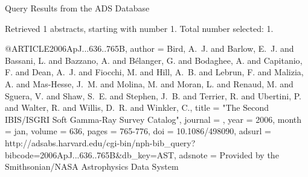 Query Results from the ADS Database


Retrieved 1 abstracts, starting with number 1.  Total number selected: 1.

@ARTICLE{2006ApJ...636..765B,
   author = {{Bird}, A.~J. and {Barlow}, E.~J. and {Bassani}, L. and {Bazzano}, A. and 
	{B{\'e}langer}, G. and {Bodaghee}, A. and {Capitanio}, F. and 
	{Dean}, A.~J. and {Fiocchi}, M. and {Hill}, A.~B. and {Lebrun}, F. and 
	{Malizia}, A. and {Mas-Hesse}, J.~M. and {Molina}, M. and {Moran}, L. and 
	{Renaud}, M. and {Sguera}, V. and {Shaw}, S.~E. and {Stephen}, J.~B. and 
	{Terrier}, R. and {Ubertini}, P. and {Walter}, R. and {Willis}, D.~R. and 
	{Winkler}, C.},
    title = "{The Second IBIS/ISGRI Soft Gamma-Ray Survey Catalog}",
  journal = {\apj},
     year = 2006,
    month = jan,
   volume = 636,
    pages = {765-776},
      doi = {10.1086/498090},
   adsurl = {http://adsabs.harvard.edu/cgi-bin/nph-bib_query?bibcode=2006ApJ...636..765B&db_key=AST},
  adsnote = {Provided by the Smithsonian/NASA Astrophysics Data System}
}



